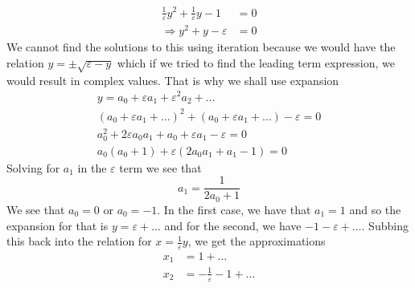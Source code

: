 \documentclass{article}
\begin{document}
\begin{equation*}
    \begin{split}
        \frac{1}{\varepsilon}y^2+\frac{1}{\varepsilon}y-1&=0\\
        \Rightarrow y^2+y-\varepsilon&=0
    \end{split}
\end{equation*}
We cannot find the solutions to this using iteration because we would have the relation $y=\pm \sqrt{\varepsilon-y}$ which if we tried to find the leading term expression, we would result in complex values. That is why we shall use expansion 
\begin{equation*}
    \begin{split}
        y=a_0+\varepsilon a_1+\varepsilon^2 a_2+\ldots \\
        (a_0+\varepsilon a_1+\ldots)^2+(a_0+\varepsilon a_1+\ldots)-\varepsilon=0 \\
        a_0^2+2\varepsilon a_0a_1+a_0+\varepsilon a_1-\varepsilon=0 \\
        a_0(a_0+1)+\varepsilon(2a_0a_1+a_1-1)=0
    \end{split}
\end{equation*}
Solving for $a_1$ in the $\varepsilon$ term we see that 
\begin{equation*}
    a_1 =\frac{1}{2a_0+1}
\end{equation*}
We see that $a_0=0$ or $a_0=-1$. In the first case, we have that $a_1=1$ and so the expansion for that is $y=\varepsilon+\ldots$ and for the second, we have $-1-\varepsilon+\ldots$. Subbing this back into the relation for $x=\frac{1}{\varepsilon}y$, we get the approximations 
\begin{equation*}
    \begin{split}
        x_1 &=1+\ldots \\
        x_2&=-\frac{1}{\varepsilon}-1+\ldots
    \end{split}
\end{equation*}
\end{document}
